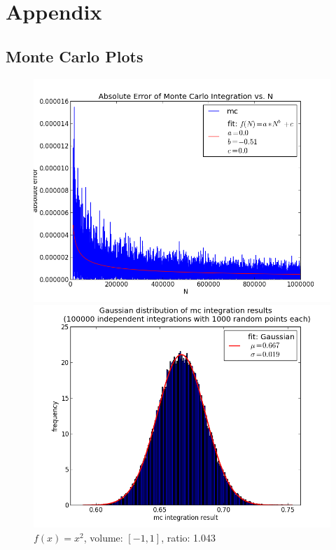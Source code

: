 \documentclass[12pt,a4paper,titlepage]{article}
\begin{document}
\section{Appendix}
\begin{appendix}
	


\section*{Monte Carlo Plots}

\begin{figure}
	\centering
	\caption{$f(x)=x^2$, volume: $[-1,1]$, ratio: 1.043}
	\begin{minipage}[b]{\linewidth}
		\centering
		\includegraphics[width=\linewidth]{Plots/quadratisch}
	\end{minipage}
	\begin{minipage}[b]{\linewidth}
		\centering
		\includegraphics[width=\linewidth]{Plots/histQuadratisch}

\end{minipage}
\end{figure}
\end{appendix}
\end{document}
